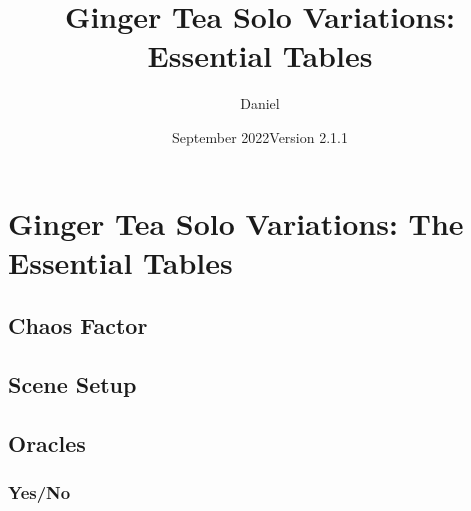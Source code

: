 

\title{Ginger Tea Solo Variations: Essential Tables}
\date{September 2022\newline{}Version 2.1.1}
\author{Daniel}


\mainmatter
\section{Ginger Tea Solo Variations: The Essential Tables}

\subsection{Chaos Factor}


\subsection{Scene Setup}




\newpage
\subsection{Oracles}
\subsubsection{Yes/No}



